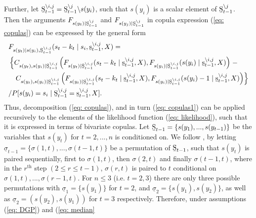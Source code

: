 \documentclass[harvard,11pt]{article}
\begin{document}
\endgroup
Further, let $\text{\b{S}}_{t-1}^{\backslash i,j}=\text{\b{S}}_{t-1}^{\backslash j}\backslash s(y_ i)$, such that $s(y_ i)$ is a scalar element of $\text{\b{S}}_{t-1}^{\backslash j}$. Then the arguments $F_{s(y_t)\mid\text{\b{S}}_{t-1}^{\backslash j}}$ and $F_{s(y_j)\mid\text{\b{S}}_{t-1}^{\backslash j}}$ in copula expression (\ref{eq: copulas}) can be expressed by the general form
\begingroup
\allowdisplaybreaks
\begin{align}\label{eq: copulas1}
\begin{split}
&F_{s(y_t)\mid s(y_{i}),\text{\b{S}}_{t-1}^{\backslash i,j}}(s_t-k_t\mid s_{i},\text{\b{s}}_{t-1}^{\backslash i,j},X)=\\
&\left\{C_{s(y_t),s(y_ i)\mid \text{\b{S}}_{t-1}^{\backslash i,j}}\left(F_{s(y_t)\mid \text{\b{S}}_{t-1}^{\backslash i,j}}(s_t-k_t\mid \text{\b{s}}_{t-1}^{\backslash i,j},X),F_{s(y_ i)\mid \text{\b{S}}_{t-1}^{\backslash i,j}}(s(y_ i)\mid \text{\b{s}}_{t-1}^{\backslash i,j},X)\right)\right.-\\
&\textcolor{white}{=}\left.C_{s(y_t),s(y_ i)\mid \text{\b{S}}_{t-1}^{\backslash i,j}}\left(F_{s(y_t)\mid \text{\b{S}}_{t-1}^{\backslash i,j}}(s_t-k_t\mid \text{\b{s}}_{t-1}^{\backslash i,j},X),F_{s(y_ i)\mid \text{\b{S}}_{t-1}^{\backslash i,j}}(s(y_ i)-1\mid \text{\b{s}}_{t-1}^{\backslash i,j},X)\right)\right\}\\
&/P[s(y_ i)=s_ i\mid \text{\b{S}}_{t-1}^{\backslash i,j}=\text{\b{s}}_{t-1}^{\backslash i,j},X].
\end{split}
\end{align}
\endgroup
Thus, decomposition (\ref{eq: copulas}), and in turn (\ref{eq: copulas1}) can be applied recursively to the elements of the likelihood function (\ref{eq: likelihood}), such that it is expressed in terms of bivariate copulas. Let $\text{\b{S}}_{t-1}=\{s(y_1),...,s(y_{t-1})\}$ be the variables that $s(y_t)$ for $t=2,...,n$ is conditioned on. We follow \citet{joe2014dependence}, by letting $\underline{\sigma}_{t-1}=\{\sigma(1,t),...,\sigma(t-1,t)\}$ be a permutation of $\text{\b{S}}_{t-1}$, such that $s(y_t)$ is paired sequentially, first to $\sigma(1,t)$, then $\sigma(2,t)$ and finally $\sigma(t-1,t)$, where in the $r^{\text{th}}$ step $(2\leq r\leq t-1)$, $\sigma(r,t)$ is paired to $t$ conditional on $\sigma(1,t),...,\sigma(r-1,t)$. For $n\leq3$ (i.e. $t=2,3$) there are only three possible permutations with $\underline{\sigma}_1=\{s(y_1)\}$ for $t=2$, and $\underline{\sigma}_2=\{s(y_1),s(y_2)\}$, as well as $\underline{\sigma}_2=(s(y_2),s(y_1))$ for $t=3$ respectively. Therefore, under assumptions (\ref{eq: DGP}) and (\ref{eq: median}%
\end{document}
